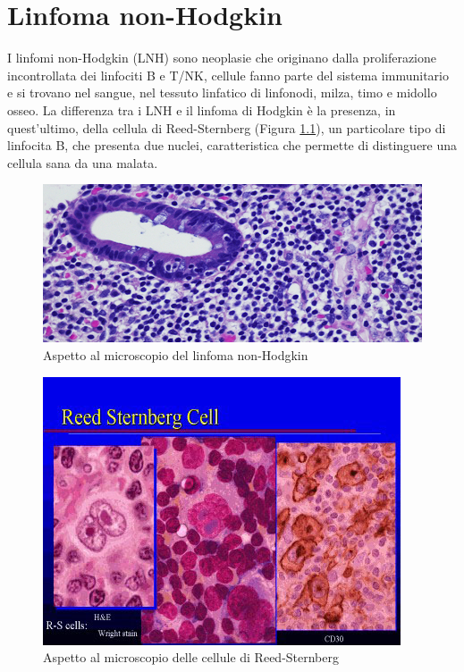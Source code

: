 \chapter{Linfoma non-Hodgkin}

I linfomi non-Hodgkin (LNH) sono neoplasie che originano dalla proliferazione incontrollata dei linfociti B e T/NK, 
cellule fanno parte del sistema immunitario e si trovano nel sangue, nel tessuto linfatico di linfonodi, milza, 
timo e midollo osseo\cite{LNHAIL}. La differenza tra i LNH e il linfoma di Hodgkin è la presenza, in quest'ultimo,
della cellula di Reed-Sternberg (Figura \ref{fig:FIGURE_2.2}), un particolare tipo di linfocita B, che presenta due nuclei, 
caratteristica che permette di distinguere una cellula sana da una malata\cite{LNHAIMAC}.\\

\begin{figure}[H]
    \begin{center}
    \includegraphics[width=0.6\columnwidth]{img/Linfoma-non-Hodgkin.jpeg}
    \vspace{-3mm}
    \end{center}
    \caption{Aspetto al microscopio del linfoma non-Hodgkin
    \cite{LNHAIL}}

\end{figure}

\begin{figure}[H]
    \begin{center}
    \includegraphics[width=0.5\columnwidth]{img/Reed-Sternberg.jpeg}
    \vspace{-3mm}
    \end{center}
    \caption{Aspetto al microscopio delle cellule di Reed-Sternberg
    \cite{MSD}}
    \label{fig:FIGURE_2.2}
\end{figure}

